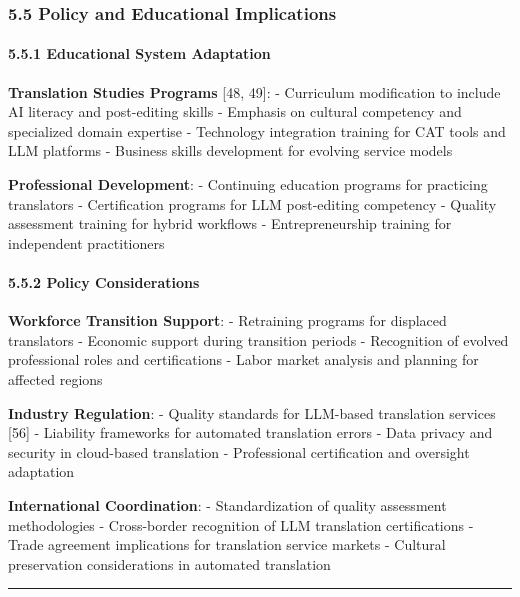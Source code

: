 \documentclass[12pt,a4paper]{article}
\begin{document}
{{{{\hypertarget{policy-and-educational-implications}{%
\subsubsection{5.5 Policy and Educational
Implications}\label{policy-and-educational-implications}}

\hypertarget{educational-system-adaptation}{%
\paragraph{5.5.1 Educational System
Adaptation}\label{educational-system-adaptation}}

\textbf{Translation Studies Programs} {[}48, 49{]}: - Curriculum
modification to include AI literacy and post-editing skills - Emphasis
on cultural competency and specialized domain expertise - Technology
integration training for CAT tools and LLM platforms - Business skills
development for evolving service models

\textbf{Professional Development}: - Continuing education programs for
practicing translators - Certification programs for LLM post-editing
competency - Quality assessment training for hybrid workflows -
Entrepreneurship training for independent practitioners

\hypertarget{policy-considerations}{%
\paragraph{5.5.2 Policy Considerations}\label{policy-considerations}}

\textbf{Workforce Transition Support}: - Retraining programs for
displaced translators - Economic support during transition periods -
Recognition of evolved professional roles and certifications - Labor
market analysis and planning for affected regions

\textbf{Industry Regulation}: - Quality standards for LLM-based
translation services {[}56{]} - Liability frameworks for automated
translation errors - Data privacy and security in cloud-based
translation - Professional certification and oversight adaptation

\textbf{International Coordination}: - Standardization of quality
assessment methodologies - Cross-border recognition of LLM translation
certifications - Trade agreement implications for translation service
markets - Cultural preservation considerations in automated translation

\begin{center}\rule{0.5\linewidth}{0.5pt}\end{center}

}}}}
\end{document}
